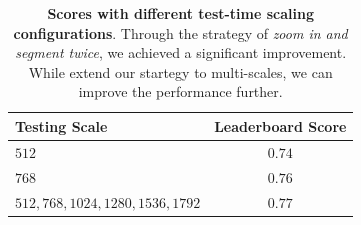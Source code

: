 \begin{table}[!t]
    \centering
    \begin{tabular}{@{}lc@{}}
    \toprule
       \textbf{Testing Scale}  &  \textbf{Leaderboard Score}\\
    \hline
        $512$ & $0.74$ \\
        $768$ & $0.76$ \\
        $512,768,1024,1280,1536,1792$ & $0.77$ \\
    \bottomrule
    \end{tabular}
    \caption{\textbf{Scores with different test-time scaling configurations}. Through the strategy of \textit{zoom in and segment twice}, we achieved a significant improvement. While extend our startegy to multi-scales, we can improve the performance further.}
    \label{tab:test_time_scale}
\end{table}



\begin{table}[!t]
    \centering
    \caption{\textbf{Official leaderboard scores}. Top 20 teams from the development phase only (as of June 21, 2025). The scores are rounded mIoU.}
    \label{tab:leaderboard_score}
\end{table}

